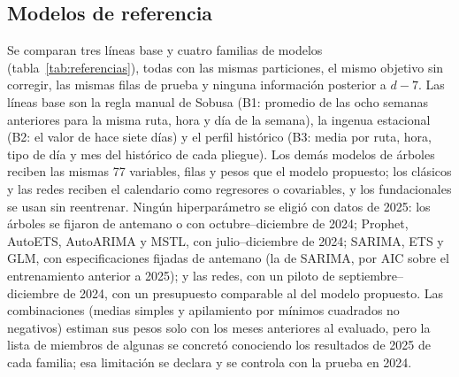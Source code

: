 \subsection{Modelos de referencia}
\label{sec:referencias}

Se comparan tres líneas base y cuatro familias de modelos (tabla~\ref{tab:referencias}), todas con las
mismas particiones, el mismo objetivo sin corregir, las mismas filas de prueba y ninguna información
posterior a $d - 7$. Las líneas base son la regla manual de Sobusa (B1: promedio de las ocho semanas
anteriores para la misma ruta, hora y día de la semana), la ingenua estacional (B2: el valor de hace siete
días) y el perfil histórico (B3: media por ruta, hora, tipo de día y mes del histórico de cada pliegue). Los
demás modelos de árboles reciben las mismas 77 variables, filas y pesos que el modelo propuesto; los
clásicos y las redes reciben el calendario como regresores o covariables, y los fundacionales se usan sin
reentrenar. Ningún hiperparámetro se eligió con datos de 2025: los árboles se fijaron de antemano o con
octubre--diciembre de 2024; Prophet, AutoETS, AutoARIMA y MSTL, con julio--diciembre de 2024; SARIMA, ETS y
GLM, con especificaciones fijadas de antemano (la de SARIMA, por AIC sobre el entrenamiento anterior a 2025);
y las redes, con un piloto de septiembre--diciembre de 2024, con un presupuesto comparable al del modelo
propuesto. Las combinaciones (medias simples y apilamiento por mínimos cuadrados no negativos) estiman sus
pesos solo con los meses anteriores al evaluado, pero la lista de miembros de algunas se concretó conociendo
los resultados de 2025 de cada familia; esa limitación se declara y se controla con la prueba en 2024.

